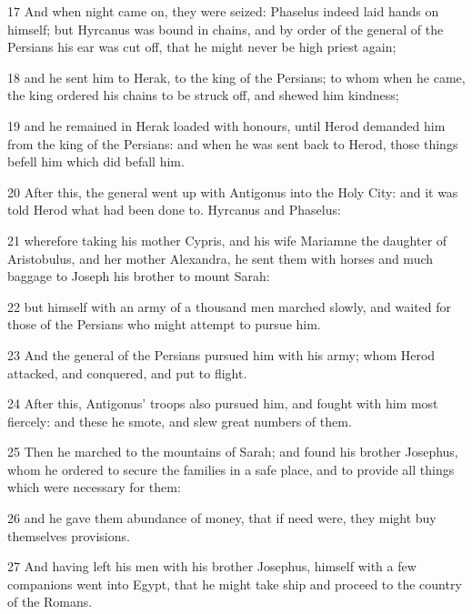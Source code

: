 \par 17 And when night came on, they were seized: Phaselus indeed laid hands on himself; but Hyrcanus was bound in chains, and by order of the general of the Persians his ear was cut off, that he might never be high priest again; 

\par 18 and he sent him to Herak, to the king of the Persians; to whom when he came, the king ordered his chains to be struck off, and shewed him kindness; 

\par 19 and he remained in Herak loaded with honours, until Herod demanded him from the king of the Persians: and when he was sent back to Herod, those things befell him which did befall him. 

\par 20 After this, the general went up with Antigonus into the Holy City: and it was told Herod what had been done to. Hyrcanus and Phaselus: 

\par 21 wherefore taking his mother Cypris, and his wife Mariamne the daughter of Aristobulus, and her mother Alexandra, he sent them with horses and much baggage to Joseph his brother to mount Sarah: 

\par 22 but himself with an army of a thousand men marched slowly, and waited for those of the Persians who might attempt to pursue him. 

\par 23 And the general of the Persians pursued him with his army; whom Herod attacked, and conquered, and put to flight. 

\par 24 After this, Antigonus’ troops also pursued him, and fought with him most fiercely: and these he smote, and slew great numbers of them. 

\par 25 Then he marched to the mountains of Sarah; and found his brother Josephus, whom he ordered to secure the families in a safe place, and to provide all things which were necessary for them: 

\par 26 and he gave them abundance of money, that if need were, they might buy themselves provisions. 

\par 27 And having left his men with his brother Josephus, himself with a few companions went into Egypt, that he might take ship and proceed to the country of the Romans. 

